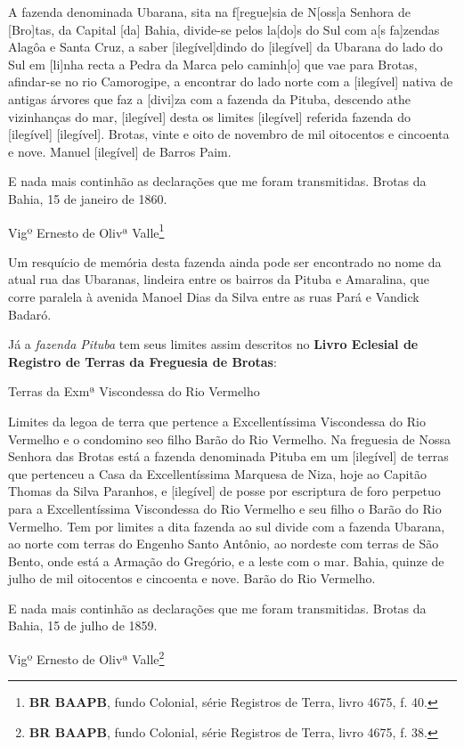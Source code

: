 \begin{citacao}
A fazenda denominada Ubarana, sita na f[regue]sia de N[oss]a Senhora de [Bro]tas, da Capital [da] Bahia, divide-se pelos la[do]s do Sul com a[s fa]zendas Alagôa e Santa Cruz, a saber [ilegível]dindo do [ilegível] da Ubarana do lado do Sul em [li]nha recta a Pedra da Marca pelo caminh[o] que vae para Brotas, afindar-se no rio Camorogipe, a encontrar do lado norte com a [ilegível] nativa de antigas árvores que faz a [divi]za com a fazenda da Pituba, descendo athe vizinhanças do mar, [ilegível] desta os limites [ilegível] referida fazenda do [ilegível] [ilegível]. Brotas, vinte e oito de novembro de mil oitocentos e cincoenta e nove. Manuel [ilegível] de Barros Paim.

E nada mais continhão as declarações que me foram transmitidas. Brotas da Bahia, 15 de janeiro de 1860.

Vigº Ernesto de Olivª Valle\footnote{\textbf{BR BAAPB}, fundo Colonial, série Registros de Terra, livro 4675, f. 40.}
\end{citacao}

Um resquício de memória desta fazenda ainda pode ser encontrado no nome da atual rua das Ubaranas, lindeira entre os bairros da Pituba e Amaralina, que corre paralela à avenida Manoel Dias da Silva entre as ruas Pará e Vandick Badaró.

Já a \textit{fazenda Pituba} tem seus limites assim descritos no \textbf{Livro Eclesial de Registro de Terras da Freguesia de Brotas}:

\begin{citacao}
Terras da Exmª Viscondessa do Rio Vermelho

Limites da legoa de terra que pertence a Excellentíssima Viscondessa do Rio Vermelho e o condomino seo filho Barão do Rio Vermelho. Na freguesia de Nossa Senhora das Brotas está a fazenda denominada Pituba em um [ilegível] de terras que pertenceu a Casa da Excellentíssima Marquesa de Niza, hoje ao Capitão Thomas da Silva Paranhos, e [ilegível] de posse por escriptura de foro perpetuo para a Excellentíssima Viscondessa do Rio Vermelho e seu filho o Barão do Rio Vermelho. Tem por limites a dita fazenda ao sul divide com a fazenda Ubarana, ao norte com terras do Engenho Santo Antônio, ao nordeste com terras de São Bento, onde está a Armação do Gregório, e a leste com o mar. Bahia, quinze de julho de mil oitocentos e cincoenta e nove. Barão do Rio Vermelho.

E nada mais continhão as declarações que me foram transmitidas. Brotas da Bahia, 15 de julho de 1859.

Vigº Ernesto de Olivª Valle\footnote{\textbf{BR BAAPB}, fundo Colonial, série Registros de Terra, livro 4675, f. 38.}
\end{citacao}

